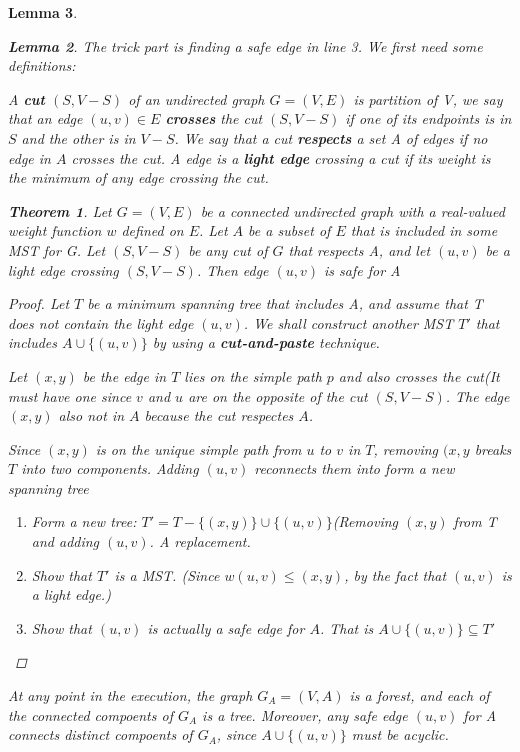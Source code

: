 \documentclass[a4paper,11pt]{book}
\newtheorem{theorem}{Theorem}[chapter]
\newtheorem{lemma}[theorem]{Lemma}
\begin{document}
{\begin{lemma}
\begin{lemma}
The trick part is finding a safe edge in line 3. We first need some definitions:

A \textbf{cut} $(S, V-S)$ of an undirected graph $G = (V, E)$ is partition of V, we say that an edge $(u,v) \in E$ \textbf{crosses} the cut $(S,V-S)$ if one of its endpoints is in $S$ and the other is in $V-S$. We say that a cut \textbf{respects} a set A of edges if no edge in $A$ crosses the cut. A edge is a \textbf{light edge} crossing a cut if its weight is the minimum of any edge crossing the cut. \\
\begin{theorem}
Let $G = (V, E)$ be a connected undirected graph with a real-valued weight function $w$ defined on $E$. Let $A$ be a subset of $E$ that is included in some MST for G. Let $(S, V-S)$ be any cut of $G$ that respects A, and let $(u,v)$ be a light edge crossing $(S, V-S)$. Then edge $(u, v)$ is safe for A
\end{theorem}
\begin{proof}
Let $T$ be a minimum spanning tree that includes A, and assume that T does not
contain the light edge $(u,v)$. We shall construct another MST $T'$ that
includes $A\cup\{(u,v)\}$ by using a \textbf{cut-and-paste} technique.

Let $(x,y)$ be the edge in $T$ lies on the simple path $p$ and also crosses the
cut(It must have one since $v$ and $u$ are on the opposite of the cut $(S,V-S)$.
The edge $(x,y)$ also not in $A$ because the cut respectes $A$.

Since $(x,y)$ is on the unique simple path from $u$ to $v$ in $T$, removing
$(x,y$ breaks $T$ into two components. Adding $(u,v)$ reconnects them into form
a new spanning tree
\begin{enumerate}
\item Form a new tree: $T' = T- \{(x,y)\}\cup \{(u,v)\}$(Removing $(x,y)$ from T
and adding $(u,v)$. A replacement.
\item Show that $T'$ is a MST. (Since $w(u,v)\leq (x,y)$, by the fact that
$(u,v)$ is a light edge.)
\item Show that $(u,v)$ is actually a safe edge for $A$. That is $A\cup \{(u,v)\} \subseteq T'$
\end{enumerate}
\end{proof}
At any point in the execution, the graph $G_A = (V, A)$ is a forest, and each of the connected compoents of $G_A$ is a tree. Moreover, any safe edge $(u,v)$ for A connects distinct compoents of $G_A$, since $A\cup \{(u,v)\}$ must be acyclic.


\end{lemma}
\end{lemma}}
\end{document}
